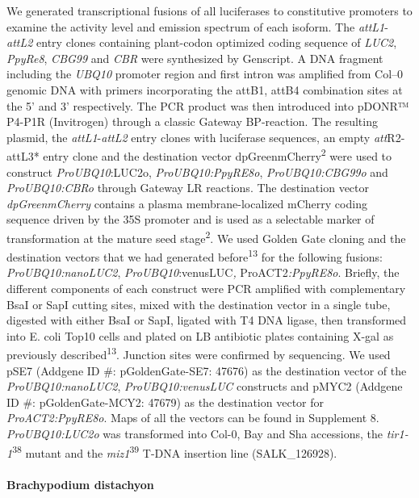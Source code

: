 \documentclass[]{article}
\begin{document}
We generated transcriptional fusions of all luciferases to constitutive
promoters to examine the activity level and emission spectrum of each
isoform. The \emph{attL1}-\emph{attL2} entry clones containing
plant-codon optimized coding sequence of \emph{LUC2}, \emph{PpyRe8},
\emph{CBG99} and \emph{CBR} were synthesized by Genscript. A DNA
fragment including the \emph{UBQ10} promoter region and first intron was
amplified from Col--0 genomic DNA with primers incorporating the attB1,
attB4 combination sites at the 5' and 3' respectively. The PCR product
was then introduced into pDONR™ P4-P1R (Invitrogen) through a classic
Gateway BP-reaction. The resulting plasmid, the
\emph{attL1}-\emph{attL2} entry clones with luciferase sequences, an
empty \emph{att}R2-attL3* entry clone and the destination vector
dpGreenmCherry\textsuperscript{2} were used to construct
\emph{ProUBQ10}:LUC2o, \emph{ProUBQ10:PpyRE8o}, \emph{ProUBQ10:CBG99o}
and \emph{ProUBQ10:CBRo} through Gateway LR reactions. The destination
vector \emph{dpGreenmCherry} contains a plasma membrane-localized
mCherry coding sequence driven by the 35S promoter and is used as a
selectable marker of transformation at the mature seed
stage\textsuperscript{2}. We used Golden Gate cloning and the
destination vectors that we had generated before\textsuperscript{13} for
the following fusions: \emph{ProUBQ10:nanoLUC2},
\emph{ProUBQ10}:venusLUC\emph{, }ProACT2\emph{:PpyRE8o}. Briefly, the
different components of each construct were PCR amplified with
complementary BsaI or SapI cutting sites, mixed with the destination
vector in a single tube, digested with either BsaI or SapI, ligated with
T4 DNA ligase, then transformed into E. coli Top10 cells and plated on
LB antibiotic plates containing X-gal as previously
described\textsuperscript{13}. Junction sites were confirmed by
sequencing. We used pSE7 (Addgene ID \#: pGoldenGate-SE7: 47676) as the
destination vector of the \emph{ProUBQ10:nanoLUC2},
\emph{ProUBQ10:venusLUC} constructs and pMYC2 (Addgene ID \#:
pGoldenGate-MCY2: 47679) as the destination vector for
\emph{ProACT2:PpyRE8o}. Maps of all the vectors can be found in
Supplement 8. \emph{ProUBQ10:LUC2o} was transformed into Col-0, Bay and
Sha accessions, the \emph{tir1-1}\textsuperscript{38} mutant and the
\emph{miz1}\textsuperscript{39} T-DNA insertion line (SALK\_126928).

\paragraph{Brachypodium distachyon}\label{brachypodium-distachyon}
\end{document}
